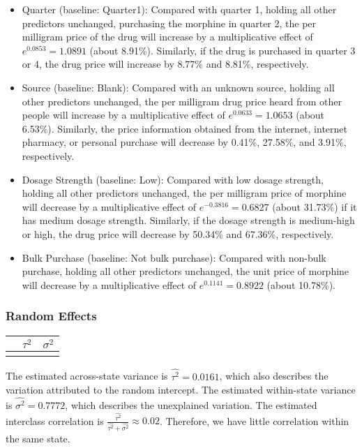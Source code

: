 \documentclass[
  11pt,
]{article}
\begin{document}
\begin{itemize}
\item
  Quarter (baseline: Quarter1): Compared with quarter 1, holding all
  other predictors unchanged, purchasing the morphine in quarter 2, the
  per milligram price of the drug will increase by a multiplicative
  effect of \(e^{0.0853} = 1.0891\) (about 8.91\%). Similarly, if the
  drug is purchased in quarter 3 or 4, the drug price will increase by
  8.77\% and 8.81\%, respectively.
\item
  Source (baseline: Blank): Compared with an unknown source, holding all
  other predictors unchanged, the per milligram drug price heard from
  other people will increase by a multiplicative effect of
  \(e^{0.0633} = 1.0653\) (about 6.53\%). Similarly, the price
  information obtained from the internet, internet pharmacy, or personal
  purchase will decrease by 0.41\%, 27.58\%, and 3.91\%, respectively.
\item
  Dosage Strength (baseline: Low): Compared with low dosage strength,
  holding all other predictors unchanged, the per milligram price of
  morphine will decrease by a multiplicative effect of
  \(e^{-0.3816} = 0.6827\) (about 31.73\%) if it has medium dosage
  strength. Similarly, if the dosage strength is medium-high or high,
  the drug price will decrease by 50.34\% and 67.36\%, respectively.
\item
  Bulk Purchase (baseline: Not bulk purchase): Compared with non-bulk
  purchase, holding all other predictors unchanged, the unit price of
  morphine will decrease by a multiplicative effect of
  \(e^{0.1141} = 0.8922\) (about 10.78\%).
\end{itemize}

\hypertarget{random-effects}{%
\subsubsection{Random Effects}\label{random-effects}}

\begin{table}[!h]
\centering
\begin{tabular}{l|r|r}
\hline
  & $\tau^2$ & $\sigma^2$\\
\hline
\cellcolor{gray!6}{Estimate} & \cellcolor{gray!6}{0.0161} & \cellcolor{gray!6}{0.7772}\\
\hline
\end{tabular}
\end{table}

The estimated across-state variance is \(\hat{\tau^2} = 0.0161\), which
also describes the variation attributed to the random intercept. The
estimated within-state variance is \(\hat{\sigma^2} = 0.7772\), which
describes the unexplained variation. The estimated interclass
correlation is
\(\frac{\hat{\tau^2}}{\hat{\tau^2} + \hat{\sigma^2}} \approx 0.02\).
Therefore, we have little correlation within the same state.
\end{document}
